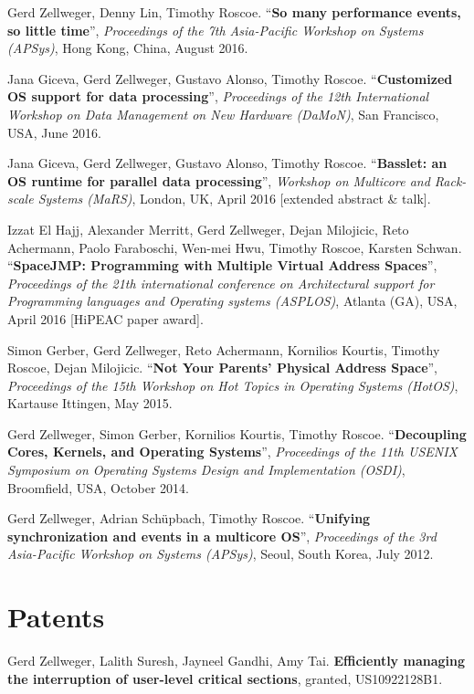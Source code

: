 \documentclass[margin,line]{cv/cv}
\begin{document}
\begin{resume}
    Gerd Zellweger, Denny Lin, Timothy Roscoe.
    ``\textbf{So many performance events, so little time}'', \textsl{Proceedings of the 7th Asia-Pacific Workshop on Systems (APSys)}, Hong Kong, China, August 2016.

    Jana Giceva, Gerd Zellweger, Gustavo Alonso, Timothy Roscoe.
    ``\textbf{Customized OS support for data processing}'',
    \textsl{Proceedings of the 12th International Workshop on Data Management on New Hardware (DaMoN)}, San Francisco, USA, June 2016.

    Jana Giceva, Gerd Zellweger, Gustavo Alonso, Timothy Roscoe.
    ``\textbf{Basslet: an OS runtime for parallel data processing}'',
    \textsl{Workshop on Multicore and Rack-scale Systems (MaRS)}, London, UK, April 2016 [extended abstract \& talk].

    Izzat El Hajj, Alexander Merritt, Gerd Zellweger, Dejan Milojicic, Reto Achermann, Paolo Faraboschi, Wen-mei Hwu, Timothy Roscoe, Karsten Schwan.
    ``\textbf{SpaceJMP: Programming with Multiple Virtual Address Spaces}'',  \textsl{Proceedings of the 21th international conference on Architectural support for Programming languages and Operating systems (ASPLOS)}, Atlanta (GA), USA, April 2016 [HiPEAC paper award].

    Simon Gerber, Gerd Zellweger, Reto Achermann, Kornilios Kourtis, Timothy Roscoe, Dejan Milojicic.
    ``\textbf{Not Your Parents' Physical Address Space}'', \textsl{Proceedings of the 15th Workshop on Hot Topics in Operating Systems (HotOS)}, Kartause Ittingen, May 2015.

    Gerd Zellweger, Simon Gerber, Kornilios Kourtis, Timothy Roscoe.
    ``\textbf{Decoupling Cores, Kernels, and Operating Systems}'',
    \textsl{Proceedings of the 11th USENIX Symposium on Operating Systems Design and Implementation (OSDI)}, Broomfield, USA, October 2014.

    Gerd Zellweger, Adrian Schüpbach, Timothy Roscoe.
    ``\textbf{Unifying synchronization and events in a multicore OS}'',
    \textsl{Proceedings of the 3rd Asia-Pacific Workshop on Systems (APSys)}, Seoul, South Korea, July 2012.


    \pagebreak

    \section{\mysidestyle Patents}

    Gerd Zellweger, Lalith Suresh, Jayneel Gandhi, Amy Tai.
    \textbf{Efficiently managing the interruption of user-level critical sections},
    granted, US10922128B1.


\end{resume}
\end{document}
